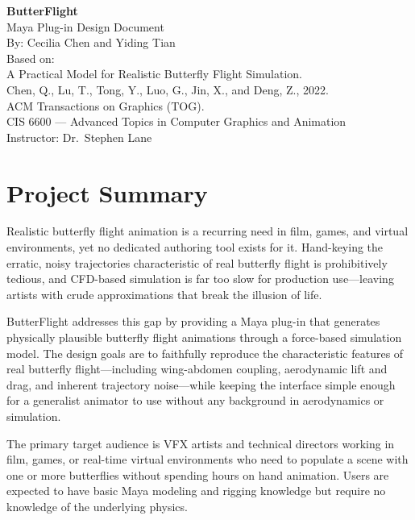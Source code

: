 \documentclass[12pt]{article}
\begin{document}
\begin{center}
\vspace*{2cm}
{\LARGE \textbf{ButterFlight}}\\[0.4cm]
{\large Maya Plug-in Design Document}\\[3cm]
{\large By: Cecilia Chen and Yiding Tian}\\[4cm]
{\large Based on:}\\[0.3cm]
{\normalsize A Practical Model for Realistic Butterfly Flight Simulation.}\\[0.2cm]
{\normalsize Chen, Q., Lu, T., Tong, Y., Luo, G., Jin, X., and Deng, Z., 2022.}\\
{\normalsize ACM Transactions on Graphics (TOG).}\\[3cm]
{\large CIS 6600 --- Advanced Topics in Computer Graphics and Animation}\\[0.3cm]
{\large Instructor: Dr.~Stephen Lane}
\end{center}

\newpage

\section*{Project Summary}

Realistic butterfly flight animation is a recurring need in film, games, and virtual
environments, yet no dedicated authoring tool exists for it. Hand-keying the erratic,
noisy trajectories characteristic of real butterfly flight is prohibitively tedious,
and CFD-based simulation is far too slow for production use---leaving artists with
crude approximations that break the illusion of life.

ButterFlight addresses this gap by providing a Maya plug-in that generates physically
plausible butterfly flight animations through a force-based simulation model. The
design goals are to faithfully reproduce the characteristic features of real butterfly
flight---including wing-abdomen coupling, aerodynamic lift and drag, and inherent
trajectory noise---while keeping the interface simple enough for a generalist animator
to use without any background in aerodynamics or simulation.

The primary target audience is VFX artists and technical directors working in film,
games, or real-time virtual environments who need to populate a scene with one or more
butterflies without spending hours on hand animation. Users are expected to have
basic Maya modeling and rigging knowledge but require no knowledge of the underlying
physics.
\end{document}
